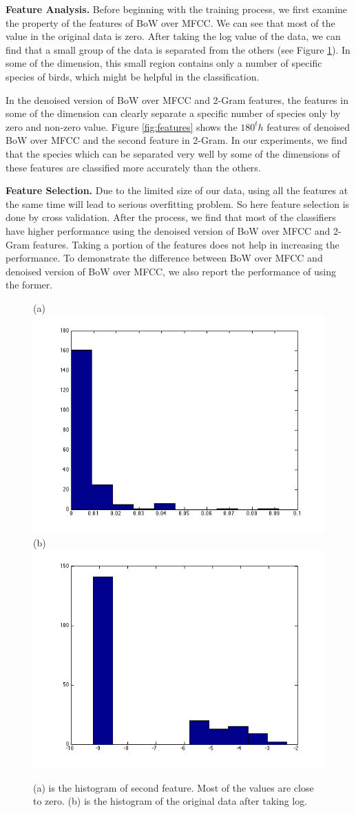 \documentclass{article} %
\begin{document}
\textbf{Feature Analysis.}
Before beginning with the training process, we first examine the property of the features of BoW over MFCC. We can see that most of the value in the original data is zero. After taking the log value of the data, we can find that a small group of the data is separated from the others (see Figure \ref{fig:hist}). In some of the dimension, this small region contains only a number of specific species of birds, which might be helpful in the classification. 

In the denoised version of BoW over MFCC and 2-Gram features, the features in some of the dimension can clearly separate a specific number of species only by zero and non-zero value. Figure \ref{fig:features} shows the $180^th$ features of denoised BoW over MFCC and the second feature in 2-Gram. In our experiments, we find that the species which can be separated very well by some of the dimensions of these features are classified more accurately than the others. 

\textbf{Feature Selection.}
Due to the limited size of our data, using all the features at the same time will lead to serious overfitting problem. So here feature selection is done by cross validation. After the process, we find that most of the classifiers have higher performance using the denoised version of BoW over MFCC and 2-Gram features. Taking a portion of the features does not help in increasing the performance. To demonstrate the difference between BoW over MFCC and denoised version of BoW over MFCC, we also report the performance of using the former. 

\begin{figure}[b!]
    \centering
    {(a)\includegraphics[width=0.40\linewidth]{../Figure/Train_features}
    (b)\includegraphics[width=0.40\linewidth]{../Figure/Train_features_log}}
    \caption{(a) is the histogram of second feature. Most of the values are close to zero. (b) is the histogram of the original data after taking log.}
    \label{fig:hist}
\end{figure}
\end{document}
